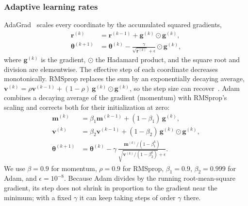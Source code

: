 \subsubsection{Adaptive learning rates}
AdaGrad~\cite{duchi_2011} scales every coordinate by the
accumulated squared gradients,
\begin{align}\label{eq:adagrad-iterate}
    \bm{r}^{(k)} &= \bm{r}^{(k-1)} + \bm{g}^{(k)}\odot\bm{g}^{(k)},\nonumber \\
    \bm{\theta}^{(k+1)} &= \bm{\theta}^{(k)} - \frac{\gamma}{\sqrt{\bm{r}^{(k)}}
    + \epsilon}\odot\bm{g}^{(k)},
\end{align}
where $\bm{g}^{(k)}$ is the gradient, $\odot$ the Hadamard product, and the
square root and division are elementwise. The effective step of each coordinate
decreases monotonically. RMSprop replaces the sum by an exponentially decaying
average, $\bm{v}^{(k)} = \rho\bm{v}^{(k-1)} + (1-\rho)\,\bm{g}^{(k)}\odot
\bm{g}^{(k)}$, so the step size can recover~\cite{goodfellow_2016}.
Adam~\cite{kingma_2017} combines a decaying average of the
gradient (momentum) with RMSprop's scaling and corrects both for their
initialization at zero:
\begin{align}\label{eq:adam-iterate}
    \bm{m}^{(k)} &= \beta_1\bm{m}^{(k-1)} + (1-\beta_1)\,\bm{g}^{(k)},\nonumber \\
    \bm{v}^{(k)} &= \beta_2\bm{v}^{(k-1)} + (1-\beta_2)\,\bm{g}^{(k)}\odot\bm{g}^{(k)},\nonumber \\
    \bm{\theta}^{(k+1)} &= \bm{\theta}^{(k)} - \gamma\,
    \frac{\bm{m}^{(k)}/(1-\beta_1^{k})}{\sqrt{\bm{v}^{(k)}/(1-\beta_2^{k})}+\epsilon}.
\end{align}
We use $\beta = 0.9$ for momentum, $\rho = 0.9$ for RMSprop, $\beta_1 = 0.9$,
$\beta_2=0.999$ for Adam, and $\epsilon=10^{-8}$. Because Adam divides by the
running root-mean-square gradient, its step does not shrink in proportion to the
gradient near the minimum; with a fixed $\gamma$ it can keep taking steps of
order $\gamma$ there.

